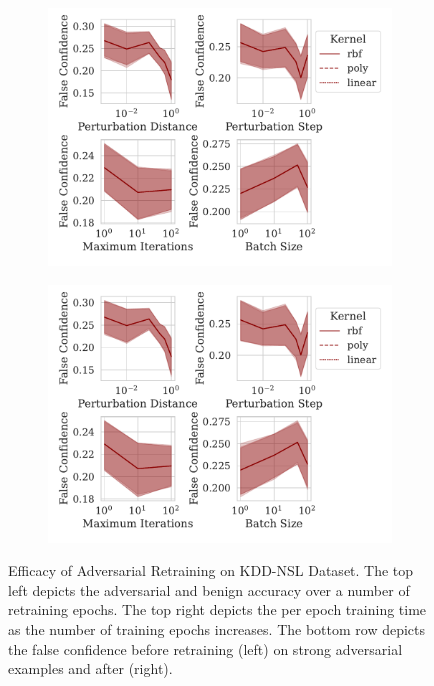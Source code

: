 \documentclass[fonts]{icst}
\begin{document}
\begin{appendices}
\begin{figure}[h!]
\begin{subfigure}{0.47\textwidth}
     \end{subfigure}
     \hfill
     \begin{subfigure}{0.47\textwidth}
         \centering
         \includegraphics[width=\textwidth]{./kdd-nsl/confidence_vs_attack_parameters.pdf}
     \end{subfigure}
     \hfill
     \begin{subfigure}{0.47\textwidth}
         \centering
         \includegraphics[width=\textwidth]{./kdd-nsl/retrain_confidence_vs_attack_parameters.pdf}
     \end{subfigure}
     \hfill
     \caption{Efficacy of Adversarial Retraining on KDD-NSL Dataset. The top left depicts the adversarial and benign accuracy over a number of retraining epochs. The top right depicts the per epoch training time as the number of training epochs increases. The bottom row depicts the false confidence before retraining (left) on strong adversarial examples and after (right).}
     \label{fig:kdd-nsl}
\end{figure}
\pagebreak
\onecolumn

\end{appendices}
\end{document}
